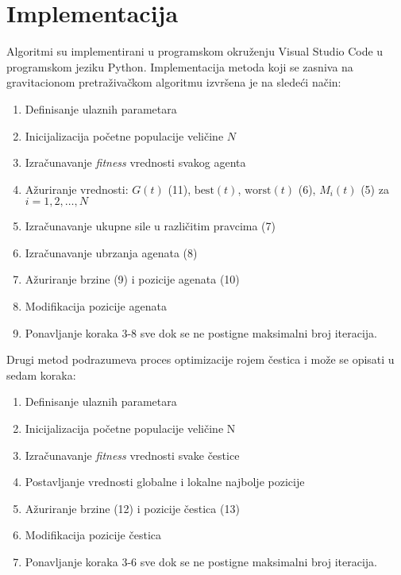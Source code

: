 \section{Implementacija}

Algoritmi su implementirani u programskom okruženju Visual Studio Code u programskom jeziku Python. Implementacija metoda koji se zasniva na gravitacionom pretraživačkom algoritmu izvršena je na sledeći način:

\begin{enumerate}
    \item Definisanje ulaznih parametara
    \item Inicijalizacija početne populacije veličine $N$
    \item Izračunavanje \emph{fitness} vrednosti svakog agenta 
    \item Ažuriranje vrednosti: $G(t)$ (11), $\mathrm{best}(t)$, $\mathrm{worst}(t)$ (6), $M_i(t)$ (5) za $i = 1, 2,\dots, N$
    \item Izračunavanje ukupne sile u različitim pravcima (7)
    \item Izračunavanje ubrzanja agenata (8)
    \item Ažuriranje brzine (9) i pozicije agenata (10)
    \item Modifikacija pozicije agenata 
    \item Ponavljanje koraka 3-8 sve dok se ne postigne maksimalni broj iteracija.
\end{enumerate}

Drugi metod podrazumeva proces optimizacije rojem čestica i može se opisati u sedam koraka:

\begin{enumerate}
    \item Definisanje ulaznih parametara
    \item Inicijalizacija početne populacije veličine N
    \item Izračunavanje \emph{fitness} vrednosti svake čestice
    \item Postavljanje vrednosti globalne i lokalne najbolje pozicije
    \item Ažuriranje brzine (12) i pozicije čestica (13)
    \item Modifikacija pozicije čestica 
    \item Ponavljanje koraka 3-6 sve dok se ne postigne maksimalni broj iteracija.
\end{enumerate}

